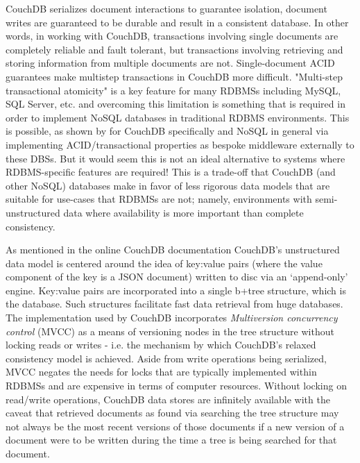 CouchDB serializes document interactions to guarantee isolation, document writes are guaranteed to be durable and result in a consistent database. In other words, in working with CouchDB, transactions involving single documents are completely reliable and fault tolerant, but transactions involving retrieving and storing information from multiple documents are not. Single-document ACID guarantees make multistep transactions in CouchDB more difficult. "Multi-step transactional atomicity" is a key feature for many RDBMSs including MySQL, SQL Server, etc. and overcoming this limitation is something that is required in order to implement NoSQL databases in traditional RDBMS environments. This is possible, as shown by \cite{Rashmi2017} for CouchDB specifically and NoSQL in general \cite{LOTFY2016133} via implementing ACID/transactional properties as bespoke middleware externally to these DBSs. But it would seem this is not an ideal alternative to systems where RDBMS-specific features are required! This is a trade-off that CouchDB (and other NoSQL) databases make in favor of less rigorous data models that are suitable for use-cases that RDBMSs are not; namely, environments with semi-unstructured data where availability is more important than complete consistency.

As mentioned in the online CouchDB documentation \cite{couchguide} CouchDB's unstructured data model is centered around the idea of key:value pairs (where the value component of the key is a JSON document) written to disc via an `append-only' engine. Key:value pairs are incorporated into a single b+tree structure, which is the database. Such structures facilitate fast data retrieval from huge databases. The implementation used by CouchDB incorporates \textit{Multiversion concurrency control} (MVCC) as a means of versioning nodes in the tree structure without locking reads or writes - i.e. the mechanism by which CouchDB's relaxed consistency model is achieved. Aside from write operations being serialized, MVCC negates the needs for locks that are typically implemented within RDBMSs and are expensive in terms of computer resources. Without locking on read/write operations, CouchDB data stores are infinitely available with the caveat that retrieved documents as found via searching the tree structure may not always be the most recent versions of those documents if a new version of a document were to be written during the time a tree is being searched for that document.

